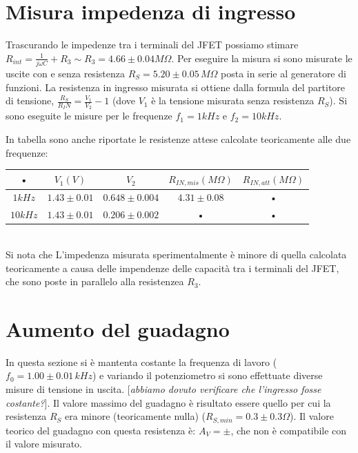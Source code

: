 \documentclass[10pt,a4paper]{article}
\newcommand{\rem}[1]{[\emph{#1}]}
\begin{document}
\section{Misura impedenza di ingresso}
Trascurando le impedenze tra i terminali del JFET possiamo stimare $R_{int} = \frac{1}{j \omega C} + R_3 \sim R_3 = 4.66\pm0.04 M\Omega$. Per eseguire la misura si sono misurate le uscite con e senza resistenza $R_{S} = 5.20 \pm 0.05 \, M\Omega$ posta in serie al generatore di funzioni. La resistenza in ingresso misurata si ottiene dalla formula del partitore di tensione, $\frac{R_S}{R_IN} = \frac {V_1}{V_2} - 1$ (dove $V_1$ è la tensione misurata senza resistenza $R_S$). Si sono eseguite le misure per le frequenze $f_1 = 1 kHz$ e $f_2 = 10 kHz$.

In tabella sono anche riportate le resistenze attese calcolate teoricamente alle due frequenze:\\

\begin{tabular}{|c|c|c|c|c|}
\hline 
• & $V_1 (V)$ & $V_2$ & $R_{IN, mis} (M\Omega)$ & $R_{IN, att} (M\Omega)$ \\ 
\hline
$1 kHz$ & $1.43 \pm 0.01$ & $0.648 \pm 0.004$ & $4.31 \pm 0.08$ & • \\ 
\hline 
$10 kHz$ & $1.43 \pm 0.01$ & $0.206 \pm 0.002$ & • & • \\ 
\hline 
\end{tabular}\\
Si nota che 
L'impedenza misurata sperimentalmente è minore di quella calcolata teoricamente a causa delle impendenze delle capacità tra i terminali del JFET, che sono poste in parallelo alla resistenzea $R_3$.

\section{Aumento del guadagno}
In questa sezione si è mantenta costante la frequenza di lavoro ($f_0 = 1.00\pm0.01\, kHz$) e variando il potenziometro si sono effettuate diverse misure di tensione in uscita. \rem{abbiamo dovuto verificare che l'ingresso fosse costante?}. Il valore massimo del guadagno è risultato essere quello per cui la resistenza $R_S$ era minore (teoricamente nulla) ($R_{S, min} = 0.3 \pm 0.3 \Omega$). 
Il valore teorico del guadagno con questa resistenza è: $A_V = \pm $, che non è compatibile con il valore misurato.
\end{document}
